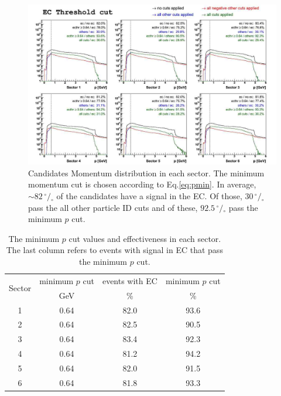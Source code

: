 \clearpage
\begin{landscape}
\begin{figure}[h]
  \centering
		\includegraphics[width=1.35\textheight]{img/ecthr_each_sector.jpg}
		\caption{Candidates Momentum distribution in each sector. The minimum momentum cut is
               chosen according to Eq.\ref{eq:pmin}. In average, $\sim 82 \,^{\circ\!\!}/\!_\circ$ 
					of the candidates have a signal in the EC. Of those, $30 \,^{\circ\!\!}/\!_\circ$
					pass the all other particle ID cuts and of these, $92.5 \,^{\circ\!\!}/\!_\circ$
					pass the minimum $p$ cut.}
 		\label{fig:pmincut}
\end{figure}
\end{landscape}



\begin{table}[h]
\label{tab:pmincut}
	\begin{center}
		\begin{tabular}{c | c | c | c}
			\hline 
			\multirow{2}{*}{Sector} 
					& minimum $p$ cut & events with EC & minimum $p$ cut \\
					&  GeV & \% & \% \\
			\hline 
			1   & 0.64 & 82.0 & 93.6 \\
			2   & 0.64 & 82.5 & 90.5 \\
			3   & 0.64 & 83.4 & 92.3 \\
			4   & 0.64 & 81.2 & 94.2 \\
			5   & 0.64 & 82.0 & 91.5 \\
			6   & 0.64 & 81.8 & 93.3 \\
			\hline
		\end{tabular}
		\caption{The minimum $p$ cut values and effectiveness in each sector.
					The last column refers to events with signal in EC that pass the 
 					minimum $p$ cut.}	
	
	\end{center}
\end{table}

